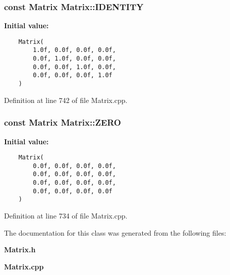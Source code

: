 \subsubsection{\setlength{\rightskip}{0pt plus 5cm}const Matrix Matrix::IDENTITY\hspace{0.3cm}{\tt  [static]}}\label{classdg_1_1Matrix_p1}


{\bf Initial value:}

\footnotesize\begin{verbatim}
    Matrix(
        1.0f, 0.0f, 0.0f, 0.0f,
        0.0f, 1.0f, 0.0f, 0.0f,
        0.0f, 0.0f, 1.0f, 0.0f,
        0.0f, 0.0f, 0.0f, 1.0f
    )\end{verbatim}\normalsize 


Definition at line 742 of file Matrix.cpp.
\subsubsection{\setlength{\rightskip}{0pt plus 5cm}const Matrix Matrix::ZERO\hspace{0.3cm}{\tt  [static]}}\label{classdg_1_1Matrix_p0}


{\bf Initial value:}

\footnotesize\begin{verbatim}
    Matrix(
        0.0f, 0.0f, 0.0f, 0.0f,
        0.0f, 0.0f, 0.0f, 0.0f,
        0.0f, 0.0f, 0.0f, 0.0f,
        0.0f, 0.0f, 0.0f, 0.0f
    )\end{verbatim}\normalsize 


Definition at line 734 of file Matrix.cpp.

The documentation for this class was generated from the following files:\begin{CompactItemize}
\item 
{\bf Matrix.h}\item 
{\bf Matrix.cpp}\end{CompactItemize}
